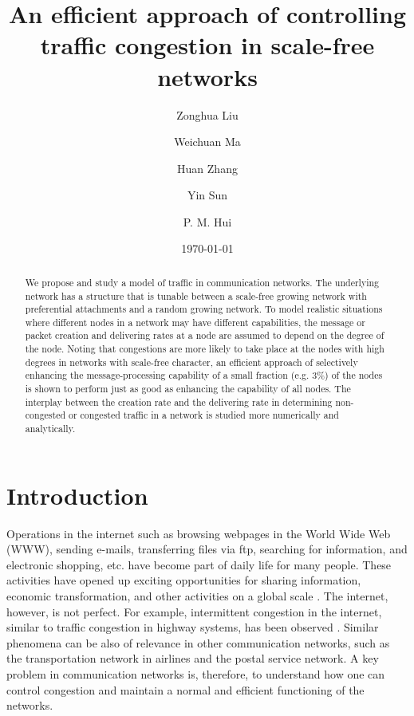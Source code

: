 \documentclass[aps,prl,twocolumn,superscriptaddress,showpacs]{revtex4}
\begin{document}
\title{An efficient approach of controlling traffic congestion in scale-free networks}

\author{Zonghua Liu}
\author{Weichuan Ma}
\author{Huan Zhang}
\author{Yin Sun}
\author{P. M. Hui}

\date{\today}

\begin{abstract}
We propose and study a model of traffic in communication networks.
The underlying network has a structure that is tunable between a
scale-free growing network with preferential attachments and a
random growing network.  To model realistic situations where
different nodes in a network may have different capabilities, the
message or packet creation and delivering rates at a node are
assumed to depend on the degree of the node.  Noting that
congestions are more likely to take place at the nodes with high
degrees in networks with scale-free character, an efficient
approach of selectively enhancing the message-processing
capability of a small fraction (e.g. $3\%$) of the nodes is shown
to perform just as good as enhancing the capability of all nodes.
The interplay between the creation rate and the delivering rate in
determining non-congested or congested traffic in a network is
studied more numerically and analytically.

\end{abstract}
 \maketitle

\section{Introduction}
Operations in the internet such as browsing webpages in the World
Wide Web (WWW), sending e-mails, transferring files via ftp,
searching for information, and electronic shopping, etc. have
become part of daily life for many people. These activities have
opened up exciting opportunities for sharing information, economic
transformation, and other activities on a global scale
\cite{Rad:1992,Rad:1993}. The internet, however, is not perfect.
For example, intermittent congestion in the internet, similar to
traffic congestion in highway systems, has been observed
\cite{Huber:1997}.  Similar phenomena can be also of relevance in
other communication networks, such as the transportation network
in airlines and the postal service network. A key problem in
communication networks is, therefore, to understand how one can
control congestion and maintain a normal and efficient functioning
of the networks.
\end{document}
